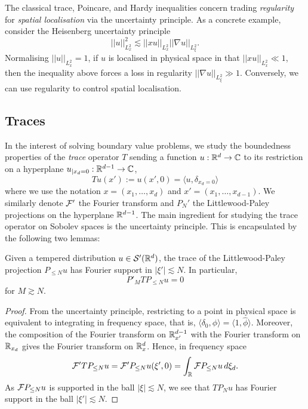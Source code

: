 The classical trace, Poincare, and Hardy inequalities concern trading \textit{regularity} for \textit{spatial localisation} via the uncertainty principle. As a concrete example, consider the Heisenberg uncertainty principle
	\begin{equation} ||u||_{L^2_x}^2 \lesssim ||x u||_{L^2_x} ||\nabla u||_{L^2_\xi}. \tag{*}\label{eq:heisen}
	\end{equation}
Normalising $||u||_{L^2_x} = 1$, if $u$ is localised in physical space in that $||xu||_{L^2_x} \ll 1$, then the inequality above forces a loss in regularity $||\nabla u||_{L^2_\xi}\gg 1$. Conversely, we can use regularity to control spatial localisation. 

\subsection{Traces}

In the interest of solving boundary value problems, we study the boundedness properties of the \emph{trace} operator $T$ sending a function $u : \mathbb R^d \to \mathbb C$ to its restriction on a hyperplane $u_{|x_d = 0} : \mathbb R^{d - 1} \to \mathbb C$, 
	\[ T u (x') := u(x', 0) = \langle u, \delta_{x_d = 0} \rangle \]
where we use the notation $x = (x_1, \dots, x_d)$ and $x' = (x_1, \dots, x_{d - 1})$. We similarly denote $\mathcal F'$ the Fourier transform and $P_N'$ the Littlewood-Paley projections on the hyperplane $\mathbb R^{d - 1}$. The main ingredient for studying the trace operator on Sobolev spaces is the uncertainty principle. This is encapsulated by the following two lemmas: 

\begin{lemma}
	Given a tempered distribution $u \in \mathcal S' (\mathbb R^d)$, the trace of the Littlewood-Paley projection $P_{\leq N} u$ has Fourier support in $|\xi'| \lesssim N$. In particular, 
		\[ P'_M T P_{\leq N} u = 0 \]
	for $M \gtrsim N$. 
\end{lemma}

\begin{proof}
	From the uncertainty principle, restricting to a point in physical space is equivalent to integrating in frequency space, that is, $\langle \delta_0, \phi \rangle = \langle 1, \widehat \phi \rangle$. Moreover, the composition of the Fourier transform on $\mathbb R^{d - 1}_{x'}$ with the Fourier transform on $\mathbb R_{x_d}$ gives the Fourier transform on $\mathbb R^d_x$. Hence, in frequency space
		\[ \mathcal F' T P_{\leq N} u = \mathcal F' P_{\leq N} u (\xi', 0) = \int_\mathbb R \mathcal F P_{\leq N} u \, d\xi_d. \]
	As $\mathcal F P_{\leq N} u$ is supported in the ball $|\xi| \lesssim N$, we see that $T P_N u$ has Fourier support in the ball $|\xi'| \lesssim N$. 	
\end{proof}

